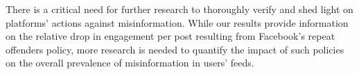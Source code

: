 \documentclass[11pt,a4paper]{article}
\begin{document}
There is a critical need for further research to thoroughly verify and shed light on platforms' actions against misinformation. 
While our results provide information on the relative drop in engagement per post resulting from Facebook’s repeat offenders policy, more research is needed to quantify the impact of such policies on the overall prevalence of misinformation in users’ feeds.
 


\end{document}
